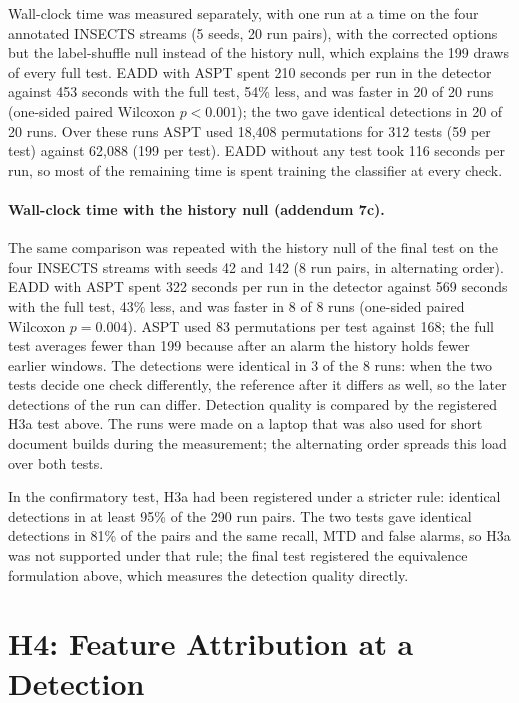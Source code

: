 Wall-clock time was measured separately, with one run at a time on the four annotated INSECTS streams (5 seeds, 20 run pairs), with the corrected options but the label-shuffle null instead of the history null, which explains the 199 draws of every full test. EADD with ASPT spent 210 seconds per run in the detector against 453 seconds with the full test, 54\% less, and was faster in 20 of 20 runs (one-sided paired Wilcoxon $p < 0.001$); the two gave identical detections in 20 of 20 runs. Over these runs ASPT used 18,408 permutations for 312 tests (59 per test) against 62,088 (199 per test). EADD without any test took 116 seconds per run, so most of the remaining time is spent training the classifier at every check.

\paragraph{Wall-clock time with the history null (addendum 7c).} The same comparison was repeated with the history null of the final test on the four INSECTS streams with seeds 42 and 142 (8 run pairs, in alternating order). EADD with ASPT spent 322 seconds per run in the detector against 569 seconds with the full test, 43\% less, and was faster in 8 of 8 runs (one-sided paired Wilcoxon $p = 0.004$). ASPT used 83 permutations per test against 168; the full test averages fewer than 199 because after an alarm the history holds fewer earlier windows. The detections were identical in 3 of the 8 runs: when the two tests decide one check differently, the reference after it differs as well, so the later detections of the run can differ. Detection quality is compared by the registered H3a test above. The runs were made on a laptop that was also used for short document builds during the measurement; the alternating order spreads this load over both tests.

In the confirmatory test, H3a had been registered under a stricter rule: identical detections in at least 95\% of the 290 run pairs. The two tests gave identical detections in 81\% of the pairs and the same recall, MTD and false alarms, so H3a was not supported under that rule; the final test registered the equivalence formulation above, which measures the detection quality directly.

\section{H4: Feature Attribution at a Detection}
\label{sec:exp4}

